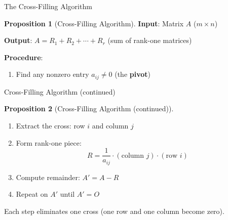 \documentclass[10pt]{beamer}
\theoremstyle{definition}
\newtheorem{prop}{Proposition}[section]
\newcommand{\x}[1]{\alert{\textbf{#1}}}
\begin{document}
\begin{frame}[fragile]{The Cross-Filling Algorithm}
\begin{prop}[Cross-Filling Algorithm]
\textbf{Input}: Matrix $A$ ($m \times n$)

\textbf{Output}: $A = R_1 + R_2 + \cdots + R_r$ (sum of rank-one matrices)

\textbf{Procedure}:
\begin{enumerate}
\item Find any nonzero entry $a_{ij} \neq 0$ (the \x{pivot})

\hspace{1cm}
\end{enumerate}
\end{prop}
\end{frame}
\begin{frame}[fragile]{Cross-Filling Algorithm (continued)}
\begin{prop}[Cross-Filling Algorithm (continued)]
\begin{enumerate}
\item Extract the cross: row $i$ and column $j$
\item Form rank-one piece:
$$R = \frac{1}{a_{ij}} \cdot (\text{column } j) \cdot (\text{row } i)$$
\item Compute remainder: $A' = A - R$
\item Repeat on $A'$ until $A' = O$
\end{enumerate}
\end{prop}

\vspace{0.2cm}
Each step eliminates one cross (one row and one column become zero).
\end{frame}
\end{document}
